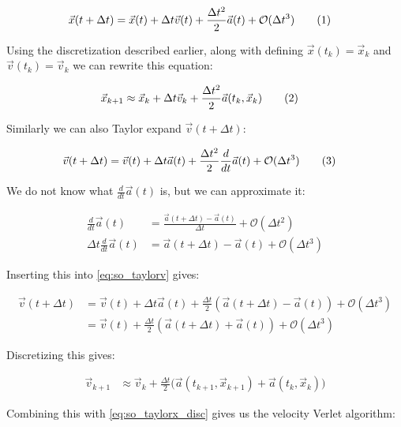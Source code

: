 \documentclass[reprint,english,notitlepage]{revtex4-1}  %
\newcommand\numberthis{\addtocounter{equation}{1}\tag{\theequation}}
\begin{document}
\begin{align*}
\vec{x}(t + \Delta t) &= \vec{x}(t) + \Delta t \vec{v}(t) + \frac{\Delta t^2}{2} \vec{a}(t) + \mathcal{O}(\Delta t^3) \numberthis \label{eq:so_taylorx}
\end{align*}

Using the discretization described earlier, along with defining $\vec{x}(t_k) = \vec{x}_k$ and $\vec{v}(t_k) = \vec{v}_k$ we can rewrite this equation: 

\begin{align*}
\vec{x}_{k + 1} &\approx \vec{x}_k + \Delta t \vec{v}_k + \frac{\Delta t^2}{2} \vec{a}(t_k,\vec{x}_k) \numberthis \label{eq:so_taylorx_disc}
\end{align*}

Similarly we can also Taylor expand $\vec{v}(t+\Delta t)$:

\begin{align*}
\vec{v}(t+\Delta t) &= \vec{v}(t) + \Delta t \vec{a}(t) + \frac{\Delta t^2}{2} \frac{d}{dt} \vec{a}(t) + \mathcal{O}(\Delta t^3) \numberthis \label{eq:so_taylorv}
\end{align*}

We do not know what $\frac{d}{dt} \vec{a}(t)$ is, but we can approximate it:

\begin{align*}
\frac{d}{dt}\vec{a}(t) &= \frac{\vec{a}(t+\Delta t) - \vec{a}(t)}{\Delta t} + \mathcal{O}(\Delta t^2) \\
\Delta t \frac{d}{dt} \vec{a}(t) &= \vec{a}(t+ \Delta t ) - \vec{a}(t) + \mathcal{O}(\Delta t^3) 
\end{align*}

Inserting this into \eqref{eq:so_taylorv} gives:

\begin{align*}
\vec{v}(t+\Delta t) &= \vec{v}(t) + \Delta t \vec{a}(t) + \frac{\Delta t}{2} (\vec{a}(t+ \Delta t ) - \vec{a}(t)) + \mathcal{O}(\Delta t^3) \\
&= \vec{v}(t) + \frac{\Delta t}{2} (\vec{a}(t+ \Delta t ) + \vec{a}(t)) +  \mathcal{O}(\Delta t^3) 
\end{align*}

Discretizing this gives:

\begin{align*}
\vec{v}_{k+1} &\approx \vec{v}_k + \frac{\Delta t}{2} \bigg( \vec{a}(t_{k+1}, \vec{x}_{k+1}) + \vec{a}(t_k, \vec{x}_k) \bigg)
\end{align*}

Combining this with \eqref{eq:so_taylorx_disc} gives us the velocity Verlet algorithm:
\end{document}
